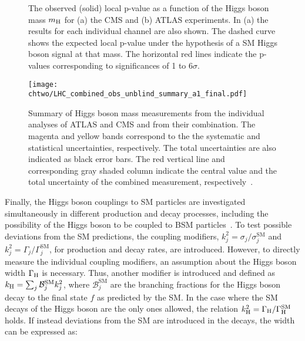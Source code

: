   \begin{figure}[!htb]
  \centering
  \caption{The observed (solid) local p-value as a function of the Higgs boson mass $m_\mathrm{H}$ for (a) the CMS and (b) ATLAS experiments. In (a) the results for each individual channel are also shown. 
  The dashed curve shows the expected local p-value under the hypothesis of a SM Higgs boson signal at that mass.
  The horizontal red lines indicate the p-values corresponding to significances of 1 to 6$\sigma$.}
  \label{fig:HiggsPvalue}
\end{figure} 

  \begin{figure}[!htb]
  \centering
  \texttt{[image: \\chtwo/LHC\_combined\_obs\_unblind\_summary\_a1\_final.pdf]}
  \caption{Summary of Higgs boson mass measurements from the individual analyses of ATLAS and CMS and from their combination.
  The magenta and yellow bands correspond to the the systematic and statistical uncertainties, respectively. The total uncertainties are also indicated as black error bars.
  The red vertical line and corresponding gray shaded column indicate the central value and the total uncertainty of the combined measurement, respectively~\cite{Aad:2015zhl}.}
  \label{fig:HiggsMass}
\end{figure} 

Finally, the Higgs boson couplings to SM particles are investigated simultaneously in different production and decay processes, including the possibility of the Higgs boson to be coupled to BSM particles~\cite{Khachatryan:2016vau}.
To test possible deviations from the SM predictions, the coupling modifiers, $k^2_j = \sigma_j/\sigma^\mathrm{SM}_j$ and $k^2_j = \Gamma_j/\Gamma^\mathrm{SM}_j$, for production and decay rates, are introduced. 
However, to directly measure the individual coupling modifiers, an assumption about the Higgs boson width $\Gamma_\mathrm{H}$ is necessary. Thus, another modifier is introduced and defined as $k_\mathrm{H} = \sum_j \mathcal{B}^\mathrm{SM}_jk^2_j$, where $\mathcal{B}^\mathrm{SM}_j$ are the branching fractions for the Higgs boson decay to the final state $f$ as predicted by the SM. In the case where the SM decays of the Higgs boson are the only ones allowed,
the relation $k^2_\mathrm{H} = \Gamma_\mathrm{H}/\Gamma^\mathrm{SM}_\mathrm{H}$ holds. If instead deviations from the SM are introduced in the decays, the width can be expressed as:

